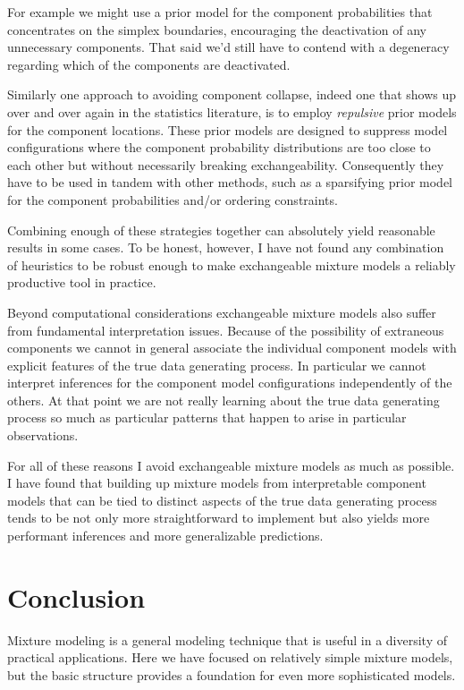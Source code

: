 \documentclass[
  letterpaper,
  DIV=11,
  numbers=noendperiod]{scrartcl}
\begin{document}
For example we might use a prior model for the component probabilities
that concentrates on the simplex boundaries, encouraging the
deactivation of any unnecessary components. That said we'd still have to
contend with a degeneracy regarding which of the components are
deactivated.

Similarly one approach to avoiding component collapse, indeed one that
shows up over and over again in the statistics literature, is to employ
\emph{repulsive} prior models for the component locations. These prior
models are designed to suppress model configurations where the component
probability distributions are too close to each other but without
necessarily breaking exchangeability. Consequently they have to be used
in tandem with other methods, such as a sparsifying prior model for the
component probabilities and/or ordering constraints.

Combining enough of these strategies together can absolutely yield
reasonable results in some cases. To be honest, however, I have not
found any combination of heuristics to be robust enough to make
exchangeable mixture models a reliably productive tool in practice.

Beyond computational considerations exchangeable mixture models also
suffer from fundamental interpretation issues. Because of the
possibility of extraneous components we cannot in general associate the
individual component models with explicit features of the true data
generating process. In particular we cannot interpret inferences for the
component model configurations independently of the others. At that
point we are not really learning about the true data generating process
so much as particular patterns that happen to arise in particular
observations.

For all of these reasons I avoid exchangeable mixture models as much as
possible. I have found that building up mixture models from
interpretable component models that can be tied to distinct aspects of
the true data generating process tends to be not only more
straightforward to implement but also yields more performant inferences
and more generalizable predictions.

\section{Conclusion}\label{conclusion}

Mixture modeling is a general modeling technique that is useful in a
diversity of practical applications. Here we have focused on relatively
simple mixture models, but the basic structure provides a foundation for
even more sophisticated models.
\end{document}
